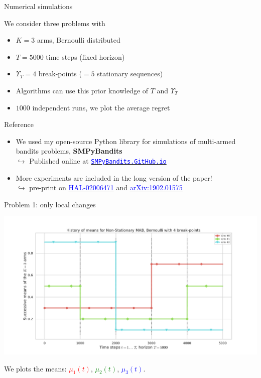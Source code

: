 \documentclass[11pt,english,ignorenonframetext,]{beamer}
\begin{document}
\begin{frame}{Numerical simulations}

  \begin{block}{We consider three problems with}
    \begin{itemize}
      \item
      $K=3$ arms, Bernoulli distributed
      \item
      $T=5000$ time steps (fixed horizon)
      \item
      $\Upsilon_T=4$ break-points ($=5$ stationary sequences)
      \item
      Algorithms can use this prior knowledge of $T$ and $\Upsilon_T$
      \item
      $1000$ independent runs, we plot the average regret
    \end{itemize}
  \end{block}

  \pause

  \begin{exampleblock}{Reference}
    \begin{itemize}
      \item
      We used my open-source Python library for simulations of multi-armed bandits problems, \textbf{SMPyBandits}\\
      $\hookrightarrow$ Published online at \href{https://SMPyBandits.GitHub.io}{\textcolor{blue}{\texttt{SMPyBandits.GitHub.io}}}
      \item
      More experiments are included in the long version of the paper!\\
      $\hookrightarrow$ pre-print on
      \href{https://hal.inria.fr/hal-02006471}{\textcolor{blue}{HAL-02006471}}
      and
      \href{https://arxiv.org/abs/1902.01575}{\textcolor{blue}{arXiv:1902.01575}}
    \end{itemize}
  \end{exampleblock}

\end{frame}


\begin{frame}[plain]{Problem 1: only local changes}
  \begin{center}
    \includegraphics[width=1.00\textwidth]{figures/Problem_1.pdf}
  \end{center}
  We plots the means:
  \textcolor{red}{$\mu_1(t)$},
  \textcolor{green}{$\mu_2(t)$},
  \textcolor{blue}{$\mu_3(t)$}.
\end{frame}
\end{document}
